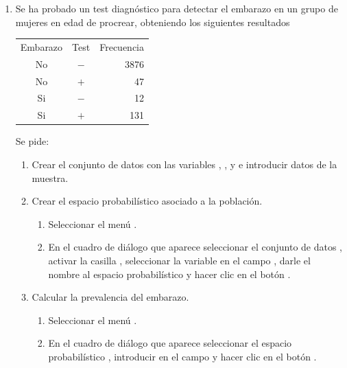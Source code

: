 \begin{enumerate}[leftmargin=*]
\item Se ha probado un test diagnóstico para detectar el embarazo en un grupo de mujeres en edad de procrear, obteniendo los siguientes
resultados
\begin{center}
\begin{tabular}{ccr}
\hline
Embarazo & Test & Frecuencia\\ 
No & $-$ & 3876\\
No & $+$ & 47\\
Si & $-$ & 12\\
Si & $+$ & 131\\
\hline
\end{tabular}
\end{center}
Se pide:
\begin{enumerate}
\item Crear el conjunto de datos  con las variables , , y  e
introducir datos de la muestra.
\item Crear el espacio probabilístico asociado a la población.
\begin{indicacion}
\begin{enumerate}
\item Seleccionar el menú .
\item En el cuadro de diálogo que aparece seleccionar el conjunto de datos , activar la casilla
, seleccionar la variable  en el campo , darle el nombre
 al espacio probabilístico y hacer clic en el botón .
\end{enumerate}
\end{indicacion}  

\item Calcular la prevalencia del embarazo.
\begin{indicacion}
\begin{enumerate}
\item Seleccionar el menú .
\item En el cuadro de diálogo que aparece seleccionar el espacio probabilístico , introducir
 en el campo  y hacer clic en el botón .
\end{enumerate}
\end{indicacion} 


\end{enumerate}
\end{enumerate}
